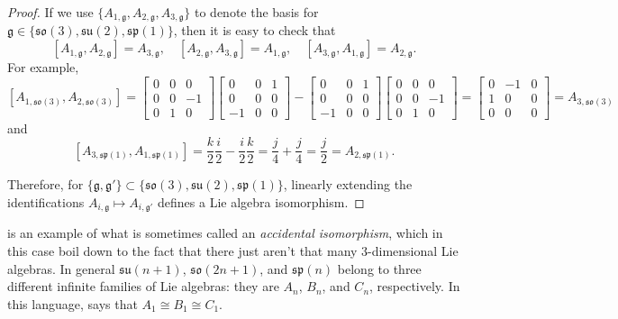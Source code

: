 \begin{proof}
	If we use $\{A_{1,\mathfrak{g}},A_{2,\mathfrak{g}},A_{3,\mathfrak{g}}\}$ to denote the basis for $\mathfrak{g} \in \{ \mathfrak{so}(3), \mathfrak{su}(2),\mathfrak{sp}(1)\}$, then it is easy to check that
	\[
		[A_{1,\mathfrak{g}}, A_{2, \mathfrak{g}}] = A_{3, \mathfrak{g}}, \quad [A_{2,\mathfrak{g}}, A_{3, \mathfrak{g}}] = A_{1, \mathfrak{g}}, \quad [A_{3,\mathfrak{g}}, A_{1, \mathfrak{g}}] = A_{2, \mathfrak{g}}.
	\]
	For example,
	\[
		[A_{1,\mathfrak{so}(3)}, A_{2, \mathfrak{so}(3)}] = \begin{bmatrix} 0 & 0 & 0 \\ 0 & 0 & -1\\ 0 & 1 & 0 \end{bmatrix} \begin{bmatrix} 0 & 0 & 1 \\ 0 & 0 & 0\\ -1 & 0 & 0 \end{bmatrix} -  \begin{bmatrix} 0 & 0 & 1 \\ 0 & 0 & 0\\ -1 & 0 & 0 \end{bmatrix} \begin{bmatrix} 0 & 0 & 0 \\ 0 & 0 & -1\\ 0 & 1 & 0 \end{bmatrix} =  \begin{bmatrix} 0 & -1 & 0 \\ 1 & 0 & 0\\ 0 & 0 & 0 \end{bmatrix} = A_{3, \mathfrak{so}(3)}
	\]
	and
	\[
		[A_{3,\mathfrak{sp}(1)}, A_{1, \mathfrak{sp}(1)}] = \frac{k}{2} \frac{i}{2} - \frac{i}{2} \frac{k}{2} = \frac{j}{4} + \frac{j}{4} =  \frac{j}{2} = A_{2, \mathfrak{sp}(1)}.
	\]
	
	Therefore, for $\{\mathfrak{g}, \mathfrak{g}'\} \subset \{\mathfrak{so}(3), \mathfrak{su}(2),\mathfrak{sp}(1)\}$, linearly extending the identifications $A_{i,\mathfrak{g}} \mapsto A_{i,\mathfrak{g}'}$ defines a Lie algebra isomorphism.
\end{proof}

 is an example of what is sometimes called an \emph{accidental isomorphism}, which in this case boil down to the fact that there just aren't that many 3-dimensional Lie algebras. In general $\mathfrak{su}(n+1)$, $\mathfrak{so}(2n+1)$, and $\mathfrak{sp}(n)$ belong to three different infinite families of Lie algebras: they are $A_n$, $B_n$, and $C_n$, respectively. In this language,  says that $A_1 \cong B_1 \cong C_1$.
